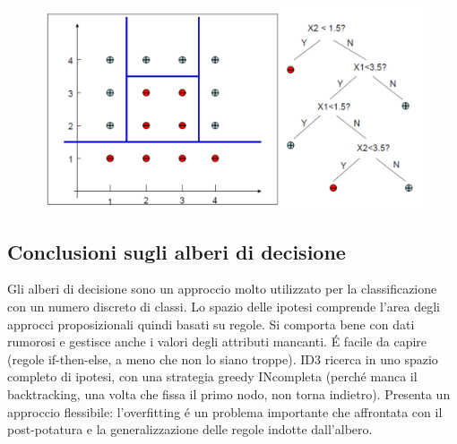 \documentclass{article}
\begin{document}
\begin{figure}[H]
\centering
\includegraphics[scale=0.5]{Images/DTdecisionboundary.png}
\end{figure}

\subsection{Conclusioni sugli alberi di decisione}
Gli alberi di decisione sono un approccio molto utilizzato per la classificazione con un numero discreto di classi. Lo spazio delle ipotesi comprende l'area degli approcci proposizionali quindi basati su regole. Si comporta bene con dati rumorosi e gestisce anche i valori degli attributi mancanti. É facile da capire (regole if-then-else, a meno che non lo siano troppe). ID3 ricerca in uno spazio completo di ipotesi, con una strategia greedy INcompleta (perché manca il backtracking, una volta che fissa il primo nodo, non torna indietro). Presenta un approccio flessibile: l'overfitting é un problema importante che affrontata con il post-potatura e la generalizzazione delle regole indotte dall'albero.
\end{document}
